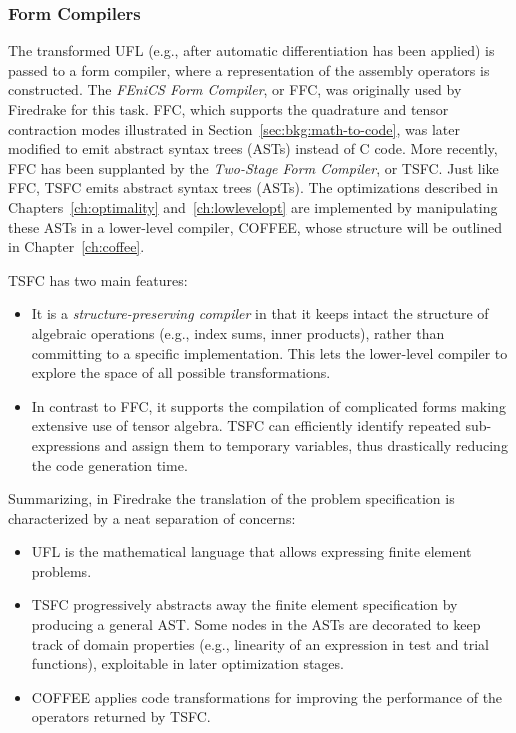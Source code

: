 \subsubsection{Form Compilers}
The transformed UFL (e.g., after automatic differentiation has been applied) is passed to a form compiler, where a representation of the assembly operators is constructed. The {\em FEniCS Form Compiler}, or FFC, was originally used by Firedrake for this task. FFC, which supports the quadrature and tensor contraction modes illustrated in Section~\ref{sec:bkg:math-to-code}, was later modified to emit abstract syntax trees (ASTs) instead of C code. More recently, FFC has been supplanted by the {\em Two-Stage Form Compiler}, or TSFC. Just like FFC, TSFC emits abstract syntax trees (ASTs). The optimizations described in Chapters~\ref{ch:optimality} and~\ref{ch:lowlevelopt} are implemented by manipulating these ASTs in a lower-level compiler, COFFEE, whose structure will be outlined in Chapter~\ref{ch:coffee}.

TSFC has two main features:
\begin{itemize}
\item It is a \textit{structure-preserving compiler} in that it keeps intact the structure of algebraic operations (e.g., index sums, inner products), rather than committing to a specific implementation. This lets the lower-level compiler to explore the space of all possible transformations.
\item In contrast to FFC, it supports the compilation of complicated forms making extensive use of tensor algebra. TSFC can efficiently identify repeated sub-expressions and assign them to temporary variables, thus drastically reducing the code generation time.
\end{itemize}

Summarizing, in Firedrake the translation of the problem specification is characterized by a neat separation of concerns:
\begin{itemize}
\item UFL is the mathematical language that allows expressing finite element problems.
\item TSFC progressively abstracts away the finite element specification by producing a general AST. Some nodes in the ASTs are decorated to keep track of domain properties (e.g., linearity of an expression in test and trial functions), exploitable in later optimization stages.
\item COFFEE applies code transformations for improving the performance of the operators returned by TSFC. 
\end{itemize}

